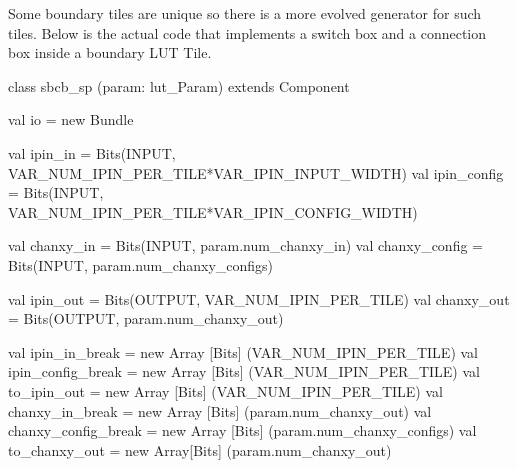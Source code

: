 Some boundary tiles are unique so there is a more evolved generator for such tiles. Below is the actual code that implements a switch box and a
 connection box inside a boundary LUT Tile. \par

\begin{scala}
class sbcb_sp (param: lut_Param) extends Component {                                                             
  val io = new Bundle {                                                                                          
    val ipin_in = Bits(INPUT, VAR_NUM_IPIN_PER_TILE*VAR_IPIN_INPUT_WIDTH)                                        
    val ipin_config = Bits(INPUT, VAR_NUM_IPIN_PER_TILE*VAR_IPIN_CONFIG_WIDTH)                                   
                                                                                                                 
    val chanxy_in = Bits(INPUT, param.num_chanxy_in)                                                             
    val chanxy_config = Bits(INPUT, param.num_chanxy_configs)                                                    
                                                                                                                 
    val ipin_out = Bits(OUTPUT, VAR_NUM_IPIN_PER_TILE)                                                           
    val chanxy_out = Bits(OUTPUT, param.num_chanxy_out)                                                          
  }                                                                                                              
                                                                                                                 
  val ipin_in_break = new Array [Bits] (VAR_NUM_IPIN_PER_TILE)                                                   
  val ipin_config_break = new Array [Bits] (VAR_NUM_IPIN_PER_TILE)                                               
  val to_ipin_out = new Array [Bits] (VAR_NUM_IPIN_PER_TILE)                                                     
  val chanxy_in_break = new Array [Bits] (param.num_chanxy_out)                                                  
  val chanxy_config_break = new Array [Bits] (param.num_chanxy_configs)                                          
  val to_chanxy_out = new Array[Bits] (param.num_chanxy_out)                                                     
                                                                                                                 
}
\end{scala}
